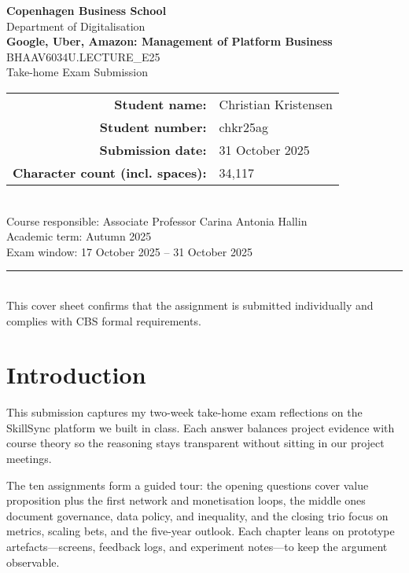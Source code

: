 \documentclass[12pt,a4paper]{article}
\newcommand{\university}{Copenhagen Business School}
\newcommand{\faculty}{Department of Digitalisation}
\newcommand{\examTitle}{Google, Uber, Amazon: Management of Platform Business}
\newcommand{\examCode}{BHAAV6034U.LECTURE\_E25}
\newcommand{\examType}{Take-home Exam Submission}
\newcommand{\studentName}{Christian Kristensen}
\newcommand{\studentId}{chkr25ag}
\newcommand{\submissionDate}{31 October 2025}
\newcommand{\wordCount}{34,117}
\begin{document}
\begin{titlepage}
  \thispagestyle{empty}
  \centering
  {\Large \textbf{\university}}\\[0.5cm]
  {\large \faculty}\\[1.5cm]
  {\LARGE \textbf{\examTitle}}\\[0.5cm]
  {\large \examCode\\\examType}\\[1.5cm]
  \begin{tabular}{rl}
    \textbf{Student name:} & \studentName \\
    \textbf{Student number:} & \studentId \\
    \textbf{Submission date:} & \submissionDate \\
    \textbf{Character count (incl. spaces):} & \wordCount \\
  \end{tabular}\\[1.5cm]
  \vfill
  {\large Course responsible: Associate Professor Carina Antonia Hallin}\\[0.3cm]
  {\large Academic term: Autumn 2025}\\[0.3cm]
  {\large Exam window: 17 October 2025 -- 31 October 2025}\\[1.5cm]
  \rule{0.8\linewidth}{0.4pt}\\[0.5cm]
  {\small This cover sheet confirms that the assignment is submitted individually and complies with CBS formal requirements.}
\end{titlepage}

\setcounter{secnumdepth}{-1}
\makeatletter
\renewcommand{\numberline}[1]{}
\makeatother

\tableofcontents
\newpage

\section*{Introduction}
This submission captures my two-week take-home exam reflections on the SkillSync platform we built in class. Each answer balances project evidence with course theory so the reasoning stays transparent without sitting in our project meetings.

The ten assignments form a guided tour: the opening questions cover value proposition plus the first network and monetisation loops, the middle ones document governance, data policy, and inequality, and the closing trio focus on metrics, scaling bets, and the five-year outlook. Each chapter leans on prototype artefacts---screens, feedback logs, and experiment notes---to keep the argument observable.
\end{document}
